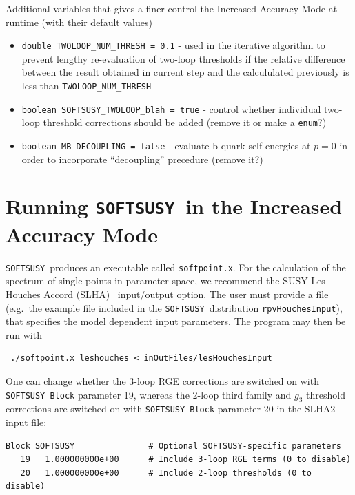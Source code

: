 \documentclass[final,3p,times,pdflatex]{elsarticle}
\def\SOFTSUSY{{\tt SOFTSUSY}}
\def\code#1{\small{\tt #1}\normalsize}
\begin{document}
Additional variables that gives a finer control the Increased Accuracy Mode at runtime (with their default values)
\begin{itemize}
	\item \verb|double TWOLOOP_NUM_THRESH = 0.1|  - used in the iterative algorithm to prevent lengthy re-evaluation of two-loop thresholds 
		if the relative difference between the result obtained in current step and the  calcululated previously is less than \verb|TWOLOOP_NUM_THRESH| 
	\item \verb|boolean SOFTSUSY_TWOLOOP_blah = true| - control whether individual two-loop threshold corrections should be added (remove it or make a \verb|enum|?)
	\item \verb|boolean MB_DECOUPLING = false| - evaluate b-quark self-energies at $p=0$ in order to incorporate ``decoupling'' precedure (remove it?)
\end{itemize}


\section{Running \SOFTSUSY~in the Increased Accuracy Mode}  
\label{sec:run}

\SOFTSUSY~produces an executable called \code{softpoint.x}. For the calculation
of the spectrum of single points in parameter space, we recommend the
SUSY Les Houches Accord (SLHA)~\cite{Skands:2003cj} input/output
option. The user must provide a file (e.g.\ the example file included
in the \SOFTSUSY~distribution
\code{rpvHouchesInput}), that specifies the model dependent input
parameters. The program may then be run with
\small
\begin{verbatim}
 ./softpoint.x leshouches < inOutFiles/lesHouchesInput
\end{verbatim}
\normalsize

One can change whether the 3-loop RGE corrections are switched on with
\code{SOFTSUSY Block} parameter 19, whereas the 2-loop third family and $g_3$
threshold corrections 
are switched on with \code{SOFTSUSY Block} parameter 20 in the SLHA2 input file:
\small
\begin{verbatim}
Block SOFTSUSY               # Optional SOFTSUSY-specific parameters
   19   1.000000000e+00      # Include 3-loop RGE terms (0 to disable)
   20   1.000000000e+00      # Include 2-loop thresholds (0 to disable)
\end{verbatim}
\normalsize
\end{document}
